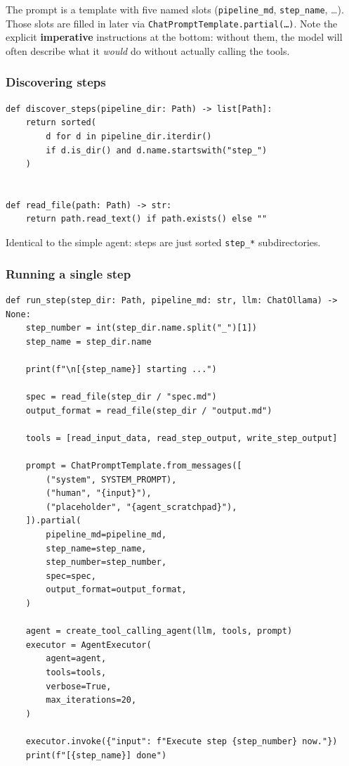\documentclass[12pt, a4paper]{article}
\begin{document}
The prompt is a template with five named slots (\texttt{pipeline\_md}, \texttt{step\_name}, \ldots). Those slots are filled in later via \texttt{ChatPromptTemplate.partial(\ldots)}. Note the explicit \textbf{imperative} instructions at the bottom: without them, the model will often describe what it \textit{would} do without actually calling the tools.

\subsubsection{Discovering steps}

\begin{lstlisting}[style=pythonstyle]
def discover_steps(pipeline_dir: Path) -> list[Path]:
    return sorted(
        d for d in pipeline_dir.iterdir()
        if d.is_dir() and d.name.startswith("step_")
    )


def read_file(path: Path) -> str:
    return path.read_text() if path.exists() else ""
\end{lstlisting}

Identical to the simple agent: steps are just sorted \texttt{step\_*} subdirectories.

\subsubsection{Running a single step}

\begin{lstlisting}[style=pythonstyle]
def run_step(step_dir: Path, pipeline_md: str, llm: ChatOllama) -> None:
    step_number = int(step_dir.name.split("_")[1])
    step_name = step_dir.name

    print(f"\n[{step_name}] starting ...")

    spec = read_file(step_dir / "spec.md")
    output_format = read_file(step_dir / "output.md")

    tools = [read_input_data, read_step_output, write_step_output]

    prompt = ChatPromptTemplate.from_messages([
        ("system", SYSTEM_PROMPT),
        ("human", "{input}"),
        ("placeholder", "{agent_scratchpad}"),
    ]).partial(
        pipeline_md=pipeline_md,
        step_name=step_name,
        step_number=step_number,
        spec=spec,
        output_format=output_format,
    )

    agent = create_tool_calling_agent(llm, tools, prompt)
    executor = AgentExecutor(
        agent=agent,
        tools=tools,
        verbose=True,
        max_iterations=20,
    )

    executor.invoke({"input": f"Execute step {step_number} now."})
    print(f"[{step_name}] done")
\end{lstlisting}
\end{document}
